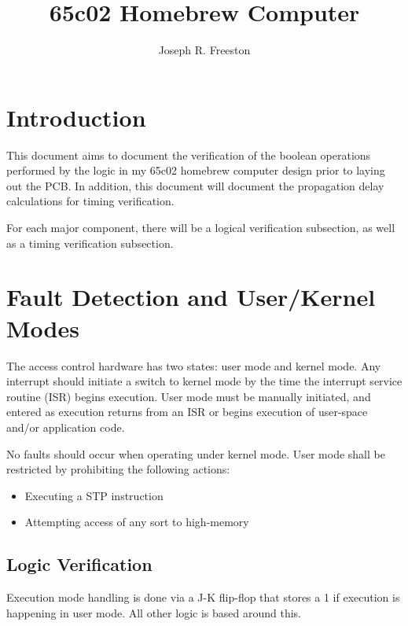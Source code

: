 \documentclass[12pt,letterpaper,fleqn]{article}
\author{Joseph R. Freeston}
\title{65c02 Homebrew Computer}
\begin{document}
\begin{titlepage}
\clearpage\maketitle
\thispagestyle{empty}
\end{titlepage}


\section{Introduction}
This document aims to document the verification of the boolean operations performed by the logic in my 65c02 homebrew computer design prior to laying out the PCB. In addition, this document will document the propagation delay calculations for timing verification.

For each major component, there will be a logical verification subsection, as well as a timing verification subsection.

\section{Fault Detection and User/Kernel Modes}

The access control hardware has two states: user mode and kernel mode.
Any interrupt should initiate a switch to kernel mode by the time the interrupt service routine (ISR) begins execution. User mode must be manually initiated, and entered as execution returns from an ISR or begins execution of user-space and/or application code.

No faults should occur when operating under kernel mode. User mode shall be restricted by prohibiting the following actions:

\begin{itemize}
	\item Executing a STP instruction
	\item Attempting access of any sort to high-memory
\end{itemize}

\subsection{Logic Verification}

Execution mode handling is done via a J-K flip-flop that stores a 1 if execution is happening in user mode. All other logic is based around this.

\newcommand{\var}[1]{\texttt{#1}}
\newcommand{\ovar}[1]{\overline{\var{#1}}}
\end{document}
